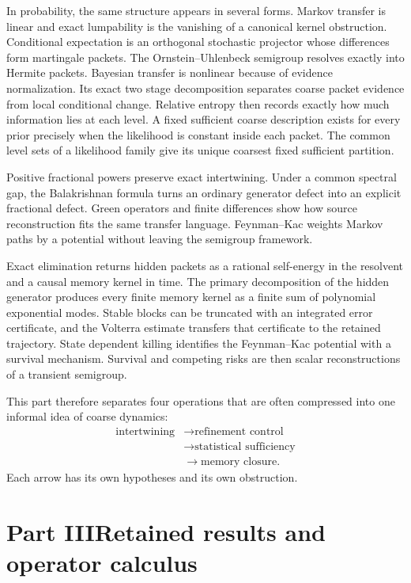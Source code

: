\documentclass[11pt,letterpaper]{article}
\theoremstyle{plain}
\theoremstyle{plain}
\theoremstyle{plain}
\theoremstyle{definition}
\theoremstyle{definition}
\theoremstyle{definition}
\theoremstyle{definition}
\theoremstyle{definition}
\theoremstyle{remark}
\theoremstyle{remark}
\theoremstyle{remark}
\theoremstyle{remark}
\theoremstyle{remark}
\theoremstyle{remark}
\begin{document}
In probability, the same structure appears in several forms. Markov transfer is linear and exact lumpability is the vanishing of a canonical kernel obstruction. Conditional expectation is an orthogonal stochastic projector whose differences form martingale packets. The Ornstein--Uhlenbeck semigroup resolves exactly into Hermite packets. Bayesian transfer is nonlinear because of evidence normalization. Its exact two stage decomposition separates coarse packet evidence from local conditional change. Relative entropy then records exactly how much information lies at each level. A fixed sufficient coarse description exists for every prior precisely when the likelihood is constant inside each packet. The common level sets of a likelihood family give its unique coarsest fixed sufficient partition.

Positive fractional powers preserve exact intertwining. Under a common spectral gap, the Balakrishnan formula turns an ordinary generator defect into an explicit fractional defect. Green operators and finite differences show how source reconstruction fits the same transfer language. Feynman--Kac weights Markov paths by a potential without leaving the semigroup framework.

Exact elimination returns hidden packets as a rational self-energy in the resolvent and a causal memory kernel in time. The primary decomposition of the hidden generator produces every finite memory kernel as a finite sum of polynomial exponential modes. Stable blocks can be truncated with an integrated error certificate, and the Volterra estimate transfers that certificate to the retained trajectory. State dependent killing identifies the Feynman--Kac potential with a survival mechanism. Survival and competing risks are then scalar reconstructions of a transient semigroup.

This part therefore separates four operations that are often compressed into one informal idea of coarse dynamics:
\[
\begin{aligned}
\text{intertwining}
&\longrightarrow
\text{refinement control}\\
&\longrightarrow
\text{statistical sufficiency}\\
&\longrightarrow
\text{memory closure}.
\end{aligned}
\]
Each arrow has its own hypotheses and its own obstruction.





\clearpage
\part*{Part III\quad Retained results and operator calculus}
\setcounter{section}{0}\setcounter{figure}{0}\setcounter{table}{0}
\renewcommand{\thesection}{R\arabic{section}}
\renewcommand{\theHsection}{R.\arabic{section}}
\renewcommand{\thefigure}{R\arabic{figure}}
\renewcommand{\theHfigure}{R.\arabic{figure}}
\renewcommand{\thetable}{R\arabic{table}}
\renewcommand{\theHtable}{R.\arabic{table}}
\FloatBarrier
\end{document}
